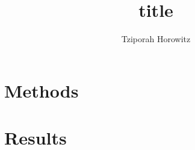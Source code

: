 \documentclass[letterpaper,man,natbib,donotrepeattitle]{apa6}
\title{title}  %
\author{Tziporah Horowitz}
\affiliation{Johns Hopkins University}
\begin{document}
\maketitle



\section{Methods}\label{sec:methods}


\section{Results}\label{sec:results}





\appendix
\section{}\label{sec:appendix}

%
\end{document}
